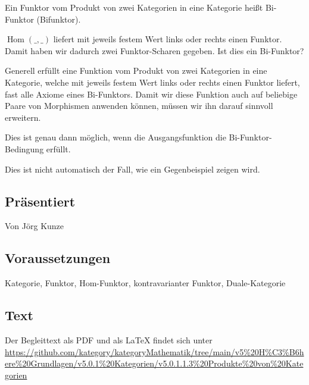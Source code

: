 \documentclass[a4paper]{amsart}
\theoremstyle{definition}
\DeclareMathOperator{\Hom}{Hom}
\begin{document}
Ein Funktor vom Produkt von zwei Kategorien in eine Kategorie heißt Bi-Funktor (Bifunktor). 

$\Hom( \_, \_ )$ liefert mit jeweils festem Wert links oder rechts einen Funktor. Damit haben wir dadurch zwei Funktor-Scharen gegeben. Ist dies ein Bi-Funktor?

Generell erfüllt eine Funktion vom Produkt von zwei Kategorien in eine Kategorie, welche mit jeweils festem Wert links oder rechts einen Funktor liefert, fast alle Axiome eines Bi-Funktors. Damit wir diese Funktion auch auf beliebige Paare von Morphismen anwenden können, müssen wir ihn darauf sinnvoll erweitern.

Dies ist genau dann möglich, wenn die Ausgangsfunktion die Bi-Funktor-Bedingung erfüllt.

Dies ist nicht automatisch der Fall, wie ein Gegenbeispiel zeigen wird.

\subsection*{Präsentiert}
Von Jörg Kunze

\subsection*{Voraussetzungen}
Kategorie, Funktor, Hom-Funktor, kontravarianter Funktor, Duale-Kategorie

\subsection*{Text}
Der Begleittext als PDF und als LaTeX findet sich unter
{\tiny
   \url{https://github.com/kategory/kategoryMathematik/tree/main/v5%20H%C3%B6here%20Grundlagen/v5.0.1%20Kategorien/v5.0.1.1.3%20Produkte%20von%20Kategorien}
}

\end{document}
